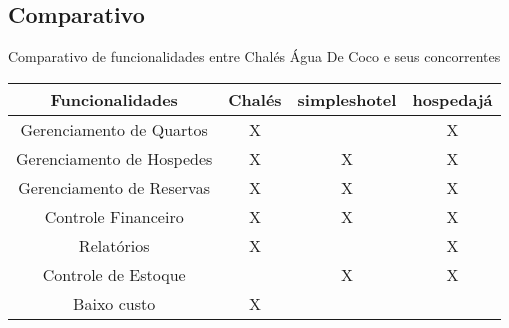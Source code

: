 \documentclass[
	12pt,				%
	openany,			%
	twoside,			%
	a4paper,			%
	english,			%
	french,				%
	spanish,			%
	brazil				%
	]{abntex2}
\begin{document}
\subsection{Comparativo}
\begin{quadro}[htb]
	\caption{\label{quadro_exemplo}Comparativo de funcionalidades entre Chalés Água De Coco e seus concorrentes}
	\begin{tabular}{|c|c|c|c|}
		\hline
		\textbf{Funcionalidades} & \textbf{Chalés} & \textbf{simpleshotel} & \textbf{hospedajá} \\ \hline
		Gerenciamento de Quartos & X    &    & X    \\ \hline
		Gerenciamento de Hospedes  & X    & X   & X    \\ \hline
		Gerenciamento de Reservas    & X   & X  & X    \\ \hline
		Controle Financeiro  & X    & X   & X    \\ \hline
		Relatórios  & X    &    & X    \\ \hline
		Controle de Estoque  &     & X   & X    \\ \hline
		Baixo custo & X    &    &     \\ \hline
	\end{tabular}
\end{quadro} 

%




\end{document}
